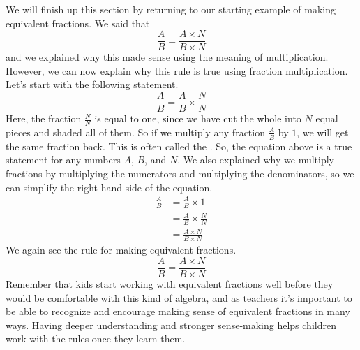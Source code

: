 \documentclass{ximera}
\begin{document}
We will finish up this section by returning to our starting example of making equivalent fractions. We said that 
\[
\frac{A}{B} = \frac{A \times N}{B \times N}
\]
and we explained why this made sense using the meaning of multiplication. However, we can now explain why this rule is true using fraction multiplication. Let's start with the following statement.
\[
\frac{A}{B} = \frac{A}{B} \times \frac{N}{N}
\]
Here, the fraction $\frac{N}{N}$ is equal to one, since we have cut the whole into $N$ equal pieces and shaded all of them. So if we multiply any fraction $\frac{A}{B}$ by $1$, we will get the same fraction back. This is often called the .  So, the equation above is a true statement for any numbers $A$, $B$, and $N$. We also explained why we multiply fractions by multiplying the numerators and multiplying the denominators, so we can simplify the right hand side of the equation.
\begin{align*}
\frac{A}{B} &= \frac{A}{B} \times 1 \\
&= \frac{A}{B} \times \frac{N}{N} \\
&= \frac{A \times N}{B \times N}
\end{align*}
We again see the rule for making equivalent fractions.
\[
\frac{A}{B} = \frac{A \times N}{B \times N}
\]
Remember that kids start working with equivalent fractions well before they would be comfortable with this kind of algebra, and as teachers it's important to be able to recognize and encourage making sense of equivalent fractions in many ways. Having deeper understanding and stronger sense-making helps children work with the rules once they learn them.
\end{document}
